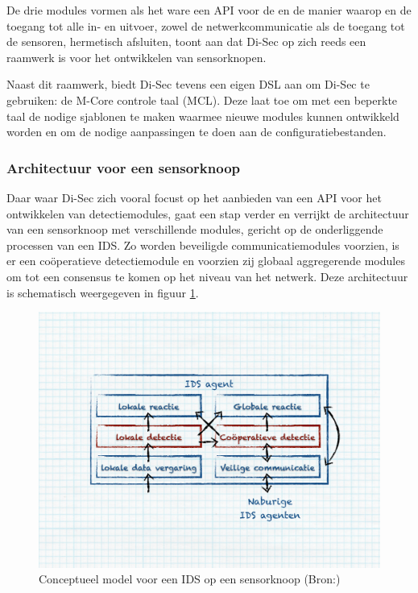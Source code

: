 De drie modules vormen als het ware een API voor de  en de manier
waarop  en  de toegang tot alle in- en uitvoer, zowel de
netwerkcommunicatie als de toegang tot de sensoren, hermetisch afsluiten, toont
aan dat Di-Sec op zich reeds een raamwerk is voor het ontwikkelen van
sensorknopen.

Naast dit raamwerk, biedt Di-Sec tevens een eigen DSL aan om Di-Sec te
gebruiken: de M-Core controle taal (MCL). Deze laat toe om met een beperkte
taal de nodige sjablonen te maken waarmee nieuwe modules kunnen ontwikkeld
worden en om de nodige aanpassingen te doen aan de configuratiebestanden.

\subsubsection*{Architectuur voor een sensorknoop}
\label{subsubsection:node-architecture}

Daar waar Di-Sec zich vooral focust op het aanbieden van een API voor het
ontwikkelen van detectiemodules, gaat \citep{zhang2000intrusion} een stap
verder en verrijkt de architectuur van een sensorknoop met verschillende
modules, gericht op de onderliggende processen van een IDS. Zo worden
beveiligde communicatiemodules voorzien, is er een co\"operatieve
detectiemodule en voorzien zij globaal aggregerende modules om tot een
consensus te komen op het niveau van het netwerk. Deze architectuur is
schematisch weergegeven in figuur \ref{fig:node-architecture}.

\begin{figure}[ht]
  \centering
  \includegraphics[width=0.9\linewidth]{resources/node-architecture.pdf}
  \caption[Conceptueel model voor een IDS op een sensorknoop]{Conceptueel model
  voor een IDS op een sensorknoop (Bron:\citep{zhang2000intrusion})}
  \label{fig:node-architecture}
\end{figure}

